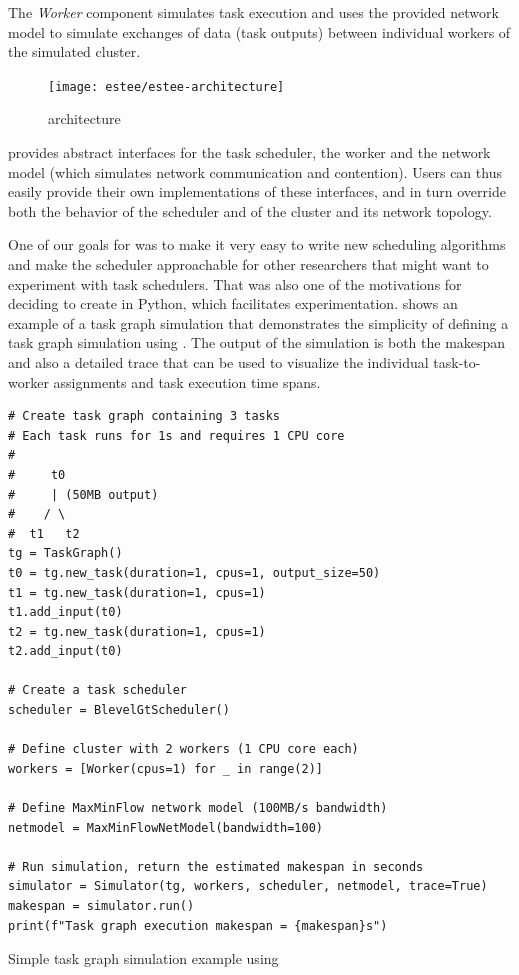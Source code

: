 The \emph{Worker} component simulates task execution and uses the provided network model to simulate exchanges of data (task
outputs) between individual workers of the simulated cluster.

\begin{figure}
	\centering
	\texttt{[image: estee/estee-architecture]}
	\caption{\estee{} architecture}
	\label{fig:estee-architecture}
\end{figure}

\estee{} provides abstract interfaces for the task scheduler, the worker and the
network model (which simulates network communication and contention). Users can thus easily provide
their own implementations of these interfaces, and in turn override both the behavior of the
scheduler and of the cluster and its network topology.

One of our goals for \estee{} was to make it very easy to write new scheduling
algorithms and make the scheduler approachable for other researchers that might want to experiment
with task schedulers. That was also one of the motivations for deciding to create
\estee{} in Python, which facilitates experimentation.  shows
an example of a task graph simulation that demonstrates the simplicity of defining a task graph
simulation using \estee{}. The output of the simulation is both the makespan and
also a detailed trace that can be used to visualize the individual task-to-worker assignments and
task execution time spans.

\begin{listing}
	\begin{verbatim}
# Create task graph containing 3 tasks
# Each task runs for 1s and requires 1 CPU core
#
#     t0
#     | (50MB output)
#    / \
#  t1   t2
tg = TaskGraph()
t0 = tg.new_task(duration=1, cpus=1, output_size=50)
t1 = tg.new_task(duration=1, cpus=1)
t1.add_input(t0)
t2 = tg.new_task(duration=1, cpus=1)
t2.add_input(t0)

# Create a task scheduler
scheduler = BlevelGtScheduler()

# Define cluster with 2 workers (1 CPU core each)
workers = [Worker(cpus=1) for _ in range(2)]

# Define MaxMinFlow network model (100MB/s bandwidth)
netmodel = MaxMinFlowNetModel(bandwidth=100)

# Run simulation, return the estimated makespan in seconds
simulator = Simulator(tg, workers, scheduler, netmodel, trace=True)
makespan = simulator.run()
print(f"Task graph execution makespan = {makespan}s")
    \end{verbatim}
	\caption{Simple task graph simulation example using \estee{}}
	\label{lst:estee-example}
\end{listing}

